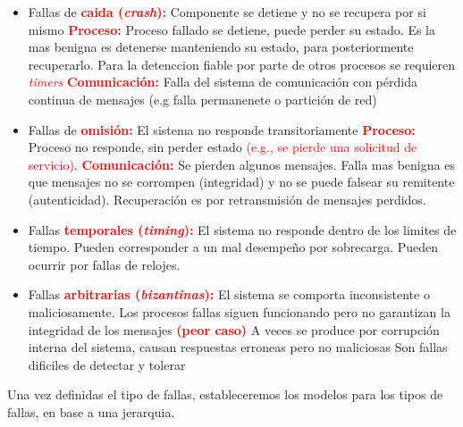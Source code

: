 \begin{itemize}
    \item Fallas de \textcolor{red}{\textbf{caida (\textit{crash}):}} Componente se detiene y no se recupera por si mismo
    \subitem \textcolor{red}{\textbf{Proceso:}} Proceso fallado se detiene, puede perder su estado. Es la mas benigna es detenerse manteniendo su estado, para posteriormente recuperarlo. Para la detenccion fiable por parte de otros procesos se requieren \textcolor{red}{\textit{timers}}
    \subitem \textcolor{red}{\textbf{Comunicación:}} Falla del sistema de comunicación con pérdida continua de mensajes (e.g falla permanenete o partición de red)

    \item Fallas de \textcolor{red}{\textbf{omisión:}} El sistema no responde transitoriamente
    \subitem \textcolor{red}{\textbf{Proceso:}} Proceso no responde, sin perder estado \textcolor{red}{(e.g., se pierde una solicitud de servicio)}.
    \subitem \textcolor{red}{\textbf{Comunicación:}} Se pierden algunos mensajes. Falla mas benigna es que mensajes no se corrompen (integridad) y no se puede falsear su
    remitente (autenticidad). Recuperación es por retransmisión de mensajes perdidos.

    \item Fallas \textcolor{red}{\textbf{temporales (\textit{timing}):}} El sistema no responde dentro de los limites de tiempo.
    \subitem Pueden corresponder a un mal desempeño por sobrecarga. 
    \subitem Pueden ocurrir por fallas de relojes.

    \item Fallas \textcolor{red}{\textbf{arbitrarias (\textit{bizantinas}):}} El sistema se comporta inconsistente o maliciosamente.
    \subitem Los procesos fallas siguen funcionando pero no garantizan la integridad de los mensajes \textcolor{red}{\textbf{(peor caso)}}
    \subitem A veces se produce por corrupción interna del sistema, causan respuestas erroneas pero no maliciosas
    \subitem Son fallas dificiles de detectar y tolerar
\end{itemize}


Una vez definidas el tipo de fallas, estableceremos los modelos para los tipos de fallas, en base a una jerarquia.

